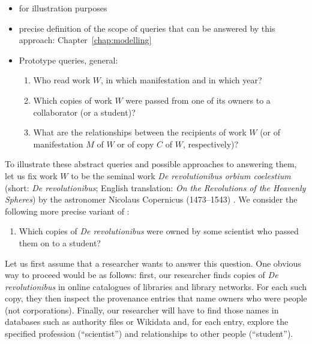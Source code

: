 \begin{itemize}
  \item
    for illustration purposes
  \item
    precise definition of the scope of queries that can be answered by this approach: Chapter~\ref{chap:modelling}
  \item
    Prototype queries, general:
    \begin{enumerate}
      \item[\exaquery{1}]
        Who read work $W$, in which manifestation and in which year?
      \item[\exaquery{2}]
        Which copies of work $W$ were passed from one of its owners to a collaborator (or a student)?
      \item[\exaquery{3}]
        What are the relationships between the recipients of work $W$
        (or of manifestation $M$ of $W$ or of copy $C$ of $W$, respectively)?
    \end{enumerate}
\end{itemize}
%
To illustrate these abstract queries and possible approaches to answering them, let us fix work $W$ to be the seminal work \emph{De revolutionibus orbium coelestium}
(short: \emph{De revolutionibus}; English translation: \emph{On the Revolutions of the Heavenly Spheres}) by the astronomer Nicolaus Copernicus (1473–1543) \cite{Kopernikus1543}.
We consider the following more precise variant of :
%
\begin{enumerate}
  \item[\exaquery{2$'$}]
    Which copies of \emph{De revolutionibus} were owned by some scientist who passed them on to a student?
\end{enumerate}
%
Let us first assume that a researcher wants to answer this question.
One obvious way to proceed would be as follows: first, our researcher finds copies of \emph{De revolutionibus} 
in online catalogues of libraries and library networks. For each such copy, they then inspect the provenance entries
that name owners who were people (not corporations). Finally, our researcher will have to find those names in databases such as
authority files or Wikidata and, for each entry, explore the specified profession (``scientist'') and relationships to other people (``student'').

